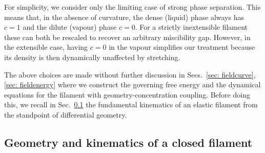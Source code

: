 \documentclass[
aip,
jcp,
reprint, 
floatfix
]{revtex4-1}
\begin{document}
For simplicity, we consider only the limiting case of strong phase separation. This means that, in the absence of curvature, the dense (liquid) phase always has $c=1$ and the dilute (vapour) phase $c=0$. For a strictly inextensible filament these can both be rescaled to recover an arbitrary miscibility gap. However, in the extensible case, having $c=0$ in the vapour simplifies our treatment because its density is then dynamically unaffected by stretching.

The above choices are made without further discussion in Secs.~\ref{sec: fieldcurve}, \ref{sec: fieldenergy} where we construct the governing free energy and the dynamical equations for the filament with geometry-concentration coupling. Before doing this, we recall in Sec.~\ref{sec: kinematics}  the fundamental kinematics of an elastic filament from the standpoint of differential geometry.

\subsection{Geometry and kinematics of a closed filament}
\label{sec: kinematics}
\end{document}
